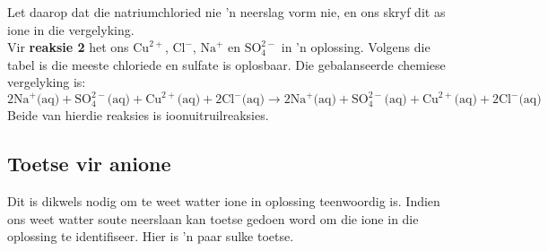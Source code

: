 Let daarop dat die natriumchloried nie  'n neerslag vorm nie, en ons skryf dit as ione in die vergelyking. \\
Vir \textbf{reaksie 2} het ons ${\text{Cu}}^{2+}$, ${\text{Cl}}^{-}$, ${\text{Na}}^{+}$ en $\text{SO}_{4}^{2-}$ in 'n oplossing. Volgens die tabel is die meeste chloriede en sulfate is oplosbaar. Die gebalanseerde chemiese vergelyking is: \\
$2{\text{Na}}^{+} \text{(aq)} + \text{SO}_{4}^{2-} \text{(aq)} + {\text{Cu}}^{2+} \text{(aq)} + 2{\text{Cl}}^{-} \text{(aq)} \to 2{\text{Na}}^{+} \text{(aq)} + \text{SO}_{4}^{2-} \text{(aq)} + {\text{Cu}}^{2+} \text{(aq)} + 2{\text{Cl}}^{-} \text{(aq)} $
Beide van hierdie reaksies is ioonuitruilreaksies.
	\par
\subsection*{Toetse vir anione}
Dit is dikwels nodig om te weet watter ione in oplossing teenwoordig is. Indien ons weet watter soute neerslaan kan toetse gedoen word om die ione in die oplossing te identifiseer. Hier is 'n paar sulke toetse.


      \label{m38719*uid70}
